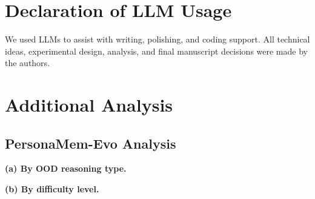 \documentclass{article}
\begin{document}
\section{Declaration of LLM Usage}
\label{llm_usage}
We used LLMs to assist with writing, polishing, and coding support. All technical ideas, experimental design, analysis, and final manuscript decisions were made by the authors.




\section{Additional Analysis}

\subsection{PersonaMem-Evo Analysis}

\begin{table}[!htbp]
\centering
\begin{minipage}[t]{0.56\linewidth}
\centering
{}
\vspace{1mm}

\textbf{(a) By OOD reasoning type.}
\end{minipage}
\hspace{0.035\linewidth}
\begin{minipage}[t]{0.38\linewidth}
\centering
{}
\vspace{1mm}

\textbf{(b) By difficulty level.}
\end{minipage}

\vspace{2mm}
\caption{PersonaMem-Evo performance breakdown by reasoning type and difficulty level using GPT-5.5.}
\label{tab:personamem_gpt55_breakdown}
\end{table}
\end{document}
